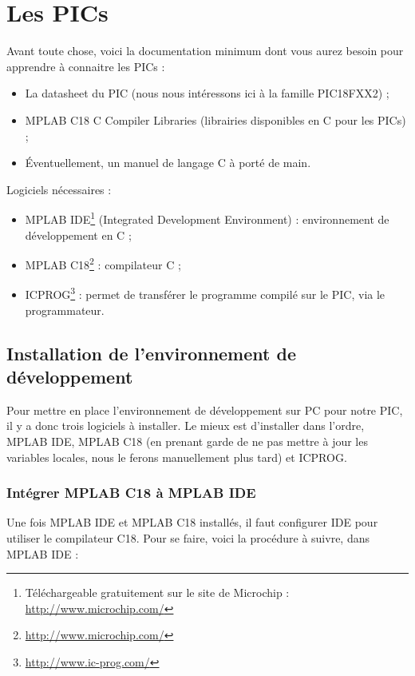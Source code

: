 \documentclass[a4paper]{article}
\begin{document}
\section{Les PICs}

Avant toute chose, voici la documentation minimum dont vous aurez besoin pour apprendre à connaitre les PICs :

\begin{itemize}
	\item La datasheet du PIC (nous nous intéressons ici à la famille PIC18FXX2) \cite{PIC18FXX2} ;
	\item MPLAB C18 C Compiler Libraries (librairies disponibles en C pour les PICs) ;
	\item Éventuellement, un manuel de langage C à porté de main.
\end{itemize}

Logiciels nécessaires :

\begin{itemize}
	\item MPLAB \ac{IDE}\footnote{Téléchargeable gratuitement sur le site de Microchip : \url{http://www.microchip.com/}} (Integrated Development Environment) : environnement de développement en C ;
	\item MPLAB C18\footnote{\url{http://www.microchip.com/}} : compilateur C ;
	\item ICPROG\footnote{\url{http://www.ic-prog.com/}} : permet de transférer le programme compilé sur le PIC, via le programmateur.
\end{itemize}

\subsection{Installation de l'environnement de développement}

Pour mettre en place l'environnement de développement sur PC pour notre PIC, il y a donc trois logiciels à installer. Le mieux est d'installer dans l'ordre, MPLAB \ac{IDE}, MPLAB C18 (en prenant garde de ne pas mettre à jour les variables locales, nous le ferons manuellement plus tard) et ICPROG.

\subsubsection{Intégrer MPLAB C18 à MPLAB IDE}

Une fois MPLAB \ac{IDE} et MPLAB C18 installés, il faut configurer \ac{IDE} pour utiliser le compilateur C18. Pour se faire, voici la procédure à suivre, dans MPLAB \ac{IDE} :
\end{document}
